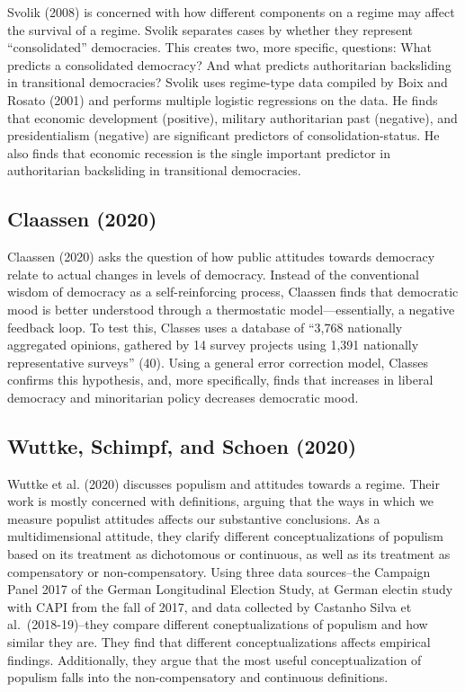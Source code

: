 \documentclass[
  english,
  man]{apa6}
\begin{document}
Svolik (2008) is concerned with how different components on a regime may affect the survival of a regime. Svolik separates cases by whether they represent \enquote{consolidated} democracies. This creates two, more specific, questions: What predicts a consolidated democracy? And what predicts authoritarian backsliding in transitional democracies? Svolik uses regime-type data compiled by Boix and Rosato (2001) and performs multiple logistic regressions on the data. He finds that economic development (positive), military authoritarian past (negative), and presidentialism (negative) are significant predictors of consolidation-status. He also finds that economic recession is the single important predictor in authoritarian backsliding in transitional democracies.

\hypertarget{claassenmooddemocracydemocratic2020}{%
\subsection{Claassen (2020)}\label{claassenmooddemocracydemocratic2020}}

Claassen (2020) asks the question of how public attitudes towards democracy relate to actual changes in levels of democracy. Instead of the conventional wisdom of democracy as a self-reinforcing process, Claassen finds that democratic mood is better understood through a thermostatic model---essentially, a negative feedback loop. To test this, Classes uses a database of \enquote{3,768 nationally aggregated opinions, gathered by 14 survey projects using 1,391 nationally representative surveys} (40). Using a general error correction model, Classes confirms this hypothesis, and, more specifically, finds that increases in liberal democracy and minoritarian policy decreases democratic mood.

\hypertarget{wuttkewhenwholegreater2020}{%
\subsection{Wuttke, Schimpf, and Schoen (2020)}\label{wuttkewhenwholegreater2020}}

Wuttke et al. (2020) discusses populism and attitudes towards a regime. Their work is mostly concerned with definitions, arguing that the ways in which we measure populist attitudes affects our substantive conclusions. As a multidimensional attitude, they clarify different conceptualizations of populism based on its treatment as dichotomous or continuous, as well as its treatment as compensatory or non-compensatory. Using three data sources--the Campaign Panel 2017 of the German Longitudinal Election Study, at German electin study with CAPI from the fall of 2017, and data collected by Castanho Silva et al.~(2018-19)--they compare different coneptualizations of populism and how similar they are. They find that different conceptualizations affects empirical findings. Additionally, they argue that the most useful conceptualization of populism falls into the non-compensatory and continuous definitions.
\end{document}

